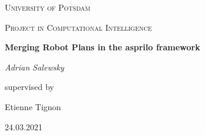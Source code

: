 \documentclass[runningheads]{llncs}
\begin{document}
\begin{titlepage}
\centering
{\scshape\LARGE University of Potsdam \par}
\vspace{1cm}
{\scshape\Large Project in Computational Intelligence\par}
\vspace{1.5cm}
{\huge\bfseries Merging Robot Plans in the asprilo framework\par}
\vspace{2cm}
{\Large\itshape Adrian Salewsky\par}
\vfill
supervised by\par
Etienne Tignon
\vfill
{24.03.2021 \par}


\begin{abstract}
The asprilo framework was created to make plans for robots in a warehouse. It uses the language Answer Set Programming
which is a good choice for such a problem because this language was made for solving NP-hard problems. The solution works 
well for a small number of robots but at some point the computation time gets too high. This is why the idea came up to create plans
for a small number of robots and then combine the plans to get a working solution. This paper shows my approach on how to solve
the plan merging problem.
\end{abstract}
\end{titlepage}
\end{document}
